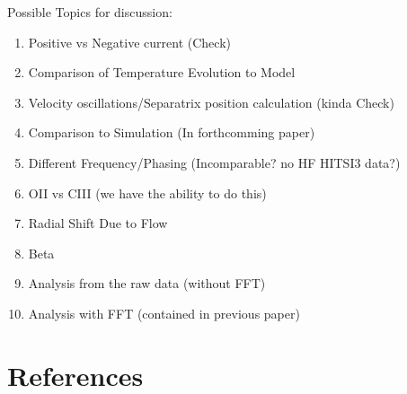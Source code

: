\documentclass{AIAA}
\begin{document}
Possible Topics for discussion:
\begin{enumerate}
\item Positive vs Negative current (Check)
\item Comparison of Temperature Evolution to Model
\item Velocity oscillations/Separatrix position calculation (kinda Check)
\item Comparison to Simulation (In forthcomming paper)
\item Different Frequency/Phasing (Incomparable? no HF HITSI3 data?)
\item OII vs CIII (we have the ability to do this)
\item Radial Shift Due to Flow
\item Beta

\item Analysis from the raw data (without FFT)
\item Analysis with FFT (contained in previous paper)
\end{enumerate}


\newpage
\section{References}
\end{document}

